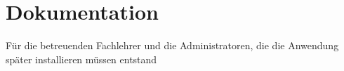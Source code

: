 \section{Dokumentation}
\label{sec:Dokumentation}
Für die betreuenden Fachlehrer und die Administratoren, die die Anwendung später installieren müssen entstand 